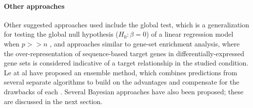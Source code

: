\paragraph{Other approaches}
Other suggested approaches used include the global test, which is a
generalization for testing the global null hypothesis ($H_0: \beta = 0$) of a
linear regression model when $p >> n$ \citep{vanIterson2013}, and approaches
similar to gene-set enrichment analysis, where the over-representation of
sequence-based target genes in differentially-expressed gene sets is considered
indicative of a target relationship in the studied condition. Le at al have proposed an ensemble
method, which combines predictions from several separate algorithms to build
on the advantages and compensate for the drawbacks of each
\citep{Le2015}.
Several Bayesian approaches have also been proposed; these are discussed in
the next section.





